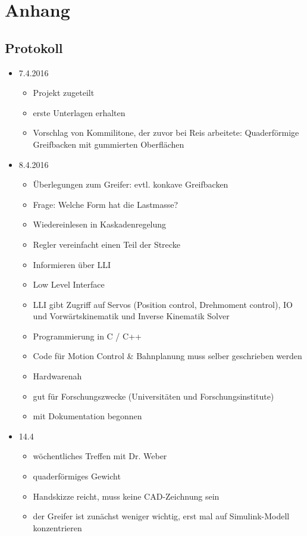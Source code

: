 \documentclass[a4paper,12pt]{article}
\begin{document}
\section*{Anhang}
\subsection{Protokoll}
\begin{itemize}
	\item 7.4.2016
	\begin{itemize}
		\item Projekt zugeteilt
		\item erste Unterlagen erhalten
		\item Vorschlag von Kommilitone, der zuvor bei Reis arbeitete: Quaderförmige Greifbacken mit gummierten Oberflächen
	\end{itemize}
	\item 8.4.2016
	\begin{itemize}
		\item Überlegungen zum Greifer: evtl. konkave Greifbacken
		\item Frage: Welche Form hat die Lastmasse?
		\item Wiedereinlesen in Kaskadenregelung
		\item Regler vereinfacht einen Teil der Strecke		
		\item Informieren über LLI
		\item Low Level Interface
		\item LLI gibt Zugriff auf Servos (Position control, Drehmoment control), IO und Vorwärtskinematik und Inverse Kinematik Solver
		\item Programmierung in C / C++
		\item Code für Motion Control \& Bahnplanung muss selber geschrieben werden
		\item Hardwarenah
		\item gut für Forschungszwecke (Universitäten und Forschungsinstitute)
		\item mit Dokumentation begonnen
	\end{itemize}
	\item 14.4
	\begin{itemize}
		\item wöchentliches Treffen mit Dr. Weber
		\item quaderförmiges Gewicht
		\item Handskizze reicht, muss keine CAD-Zeichnung sein
		\item der Greifer ist zunächst weniger wichtig, erst mal auf Simulink-Modell konzentrieren

\end{itemize}
\end{itemize}
\end{document}
